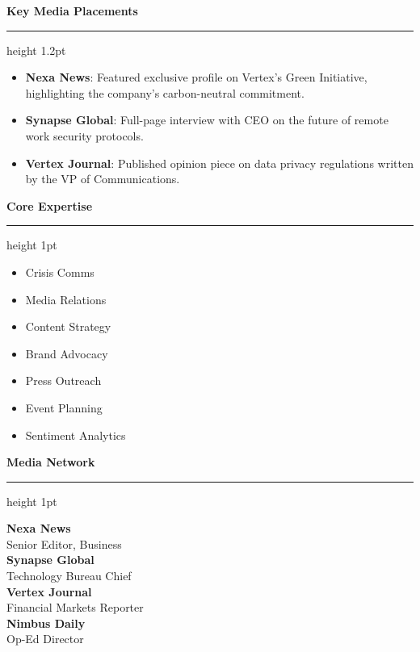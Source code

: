 \documentclass[10pt]{article}
\newcommand{\sectiontitle}[1]{%
  \vspace{0.15cm}%
  {\large \bfseries \color{primary} #1}%
  \vspace{0.05cm}%
  {\color{secondary}\hrule height 1.2pt}%
  \vspace{0.1cm}%
}
\newcommand{\sidebartitle}[1]{%
  \vspace{0.15cm}%
  {\normalsize \bfseries \color{primary} #1}%
  \vspace{0.05cm}%
  {\color{secondary}\hrule height 1pt}%
  \vspace{0.08cm}%
}
\begin{document}
\begin{minipage}[t]{0.66\textwidth}
  \sectiontitle{Key Media Placements}
  \begin{itemize}[leftmargin=*,noitemsep,topsep=0pt,parsep=1pt,partopsep=0pt]
    \item \textbf{Nexa News}: Featured exclusive profile on Vertex's Green Initiative, highlighting the company's carbon-neutral commitment.
    \item \textbf{Synapse Global}: Full-page interview with CEO on the future of remote work security protocols.
    \item \textbf{Vertex Journal}: Published opinion piece on data privacy regulations written by the VP of Communications.
  \end{itemize}
\end{minipage}%
\hfill%
\begin{minipage}[t]{0.30\textwidth}
  \begin{tcolorbox}[
    colback=lightbg,
    colframe=divider,
    arc=4pt,
    boxrule=1pt,
    top=6pt,
    bottom=6pt,
    left=6pt,
    right=6pt,
    boxsep=0pt,
    before=\vspace{0pt},
    after=\vspace{0pt}
  ]
    \sidebartitle{Core Expertise}
    \begin{itemize}[leftmargin=10pt,label=\tiny\ensuremath{\blacksquare},noitemsep,topsep=0pt,parsep=1.5pt,partopsep=0pt]
      \item Crisis Comms
      \item Media Relations
      \item Content Strategy
      \item Brand Advocacy
      \item Press Outreach
      \item Event Planning
      \item Sentiment Analytics
    \end{itemize}

    \sidebartitle{Media Network}
    \textbf{Nexa News} \\
    {\small Senior Editor, Business} \\[0.1cm]
    \textbf{Synapse Global} \\
    {\small Technology Bureau Chief} \\[0.1cm]
    \textbf{Vertex Journal} \\
    {\small Financial Markets Reporter} \\[0.1cm]
    \textbf{Nimbus Daily} \\
    {\small Op-Ed Director}


\end{tcolorbox}
\end{minipage}
\end{document}

